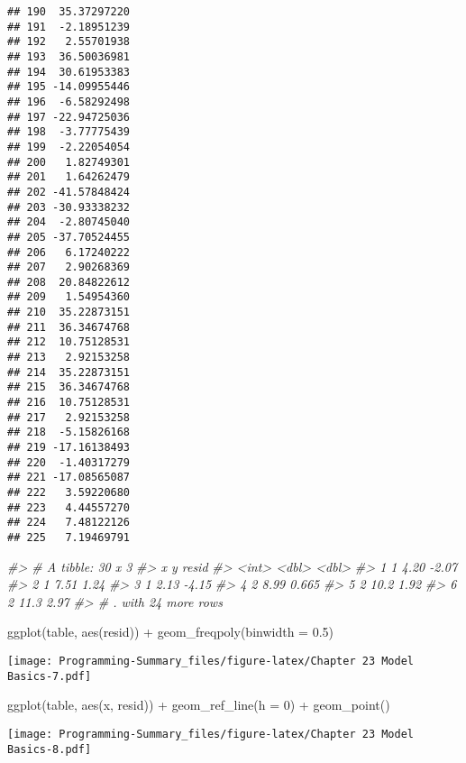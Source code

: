 \documentclass[
]{article}
\newenvironment{Shaded}{\begin{snugshade}}{\end{snugshade}}
\newcommand{\AttributeTok}[1]{\textcolor[rgb]{0.77,0.63,0.00}{#1}}
\newcommand{\CommentTok}[1]{\textcolor[rgb]{0.56,0.35,0.01}{\textit{#1}}}
\newcommand{\DecValTok}[1]{\textcolor[rgb]{0.00,0.00,0.81}{#1}}
\newcommand{\FloatTok}[1]{\textcolor[rgb]{0.00,0.00,0.81}{#1}}
\newcommand{\FunctionTok}[1]{\textcolor[rgb]{0.00,0.00,0.00}{#1}}
\newcommand{\NormalTok}[1]{#1}
\newcommand{\SpecialCharTok}[1]{\textcolor[rgb]{0.00,0.00,0.00}{#1}}
\begin{document}
\begin{verbatim}
## 190  35.37297220
## 191  -2.18951239
## 192   2.55701938
## 193  36.50036981
## 194  30.61953383
## 195 -14.09955446
## 196  -6.58292498
## 197 -22.94725036
## 198  -3.77775439
## 199  -2.22054054
## 200   1.82749301
## 201   1.64262479
## 202 -41.57848424
## 203 -30.93338232
## 204  -2.80745040
## 205 -37.70524455
## 206   6.17240222
## 207   2.90268369
## 208  20.84822612
## 209   1.54954360
## 210  35.22873151
## 211  36.34674768
## 212  10.75128531
## 213   2.92153258
## 214  35.22873151
## 215  36.34674768
## 216  10.75128531
## 217   2.92153258
## 218  -5.15826168
## 219 -17.16138493
## 220  -1.40317279
## 221 -17.08565087
## 222   3.59220680
## 223   4.44557270
## 224   7.48122126
## 225   7.19469791
\end{verbatim}

\begin{Shaded}
\begin{Highlighting}[]
\CommentTok{\#\textgreater{} \# A tibble: 30 x 3}
\CommentTok{\#\textgreater{}       x     y  resid}
\CommentTok{\#\textgreater{}   \textless{}int\textgreater{} \textless{}dbl\textgreater{}  \textless{}dbl\textgreater{}}
\CommentTok{\#\textgreater{} 1     1  4.20 {-}2.07 }
\CommentTok{\#\textgreater{} 2     1  7.51  1.24 }
\CommentTok{\#\textgreater{} 3     1  2.13 {-}4.15 }
\CommentTok{\#\textgreater{} 4     2  8.99  0.665}
\CommentTok{\#\textgreater{} 5     2 10.2   1.92 }
\CommentTok{\#\textgreater{} 6     2 11.3   2.97 }
\CommentTok{\#\textgreater{} \# . with 24 more rows}

\FunctionTok{ggplot}\NormalTok{(table, }\FunctionTok{aes}\NormalTok{(resid)) }\SpecialCharTok{+} 
  \FunctionTok{geom\_freqpoly}\NormalTok{(}\AttributeTok{binwidth =} \FloatTok{0.5}\NormalTok{)}
\end{Highlighting}
\end{Shaded}

\texttt{[image: Programming-Summary\_files/figure-latex/Chapter 23 Model Basics-7.pdf]}

\begin{Shaded}
\begin{Highlighting}[]
\FunctionTok{ggplot}\NormalTok{(table, }\FunctionTok{aes}\NormalTok{(x, resid)) }\SpecialCharTok{+} 
  \FunctionTok{geom\_ref\_line}\NormalTok{(}\AttributeTok{h =} \DecValTok{0}\NormalTok{) }\SpecialCharTok{+}
  \FunctionTok{geom\_point}\NormalTok{() }
\end{Highlighting}
\end{Shaded}

\texttt{[image: Programming-Summary\_files/figure-latex/Chapter 23 Model Basics-8.pdf]}
\end{document}
